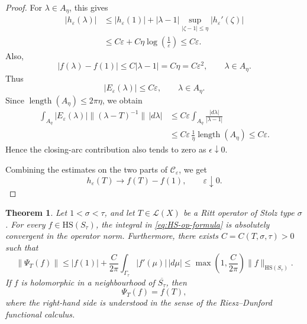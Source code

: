 \documentclass[11pt]{amsart}
\numberwithin{equation}{section}
\newtheorem{theorem}{Theorem}[section]
\theoremstyle{definition}
\theoremstyle{plain}
\def\L{L}
\newcommand{\HS}{\mathrm{HS}}
\renewcommand{\L}{\mathcal L}
\begin{document}
\begin{proof}
For \(\lambda\in A_\eta\), this gives
\[
\begin{aligned}
        |h_\varepsilon(\lambda)|
        &\le
        |h_\varepsilon(1)|
        +
        |\lambda-1|
        \sup_{|\zeta-1|\le\eta}|h_\varepsilon'(\zeta)|        \\
        &\le
        C\varepsilon
        +
        C\eta\log \left(\frac{1}{\varepsilon}\right)
        \le
        C\varepsilon .
\end{aligned}
\]
Also,
\[
        |f(\lambda)-f(1)|
        \le C|\lambda-1|
        =
        C\eta
        =
        C\varepsilon^2,
        \qquad \lambda\in A_\eta .
\]
Thus
\[
        |E_\varepsilon(\lambda)|\le C\varepsilon,
        \qquad \lambda\in A_\eta .
\]
Since \(\operatorname{length}(A_\eta)\le 2\pi \eta\), we obtain
\[
\begin{aligned}
        \int_{A_\eta}
        |E_\varepsilon(\lambda)|
        \|(\lambda -T)^{-1}\|\,|d\lambda|
        &\le
        C\varepsilon
        \int_{A_\eta} \frac{|d\lambda|}{|\lambda-1|}        \\
        &\le
        C\varepsilon\, \frac{1}{\eta}\operatorname{length}(A_\eta)
        \le
        C\varepsilon .
\end{aligned}
\]
Hence the closing-arc contribution also tends to zero as \(\epsilon \downarrow 0\).

Combining the estimates on the two parts of
\(\mathcal C_\varepsilon\), we get
\[
        h_\varepsilon(T)\longrightarrow f(T)-f(1), \qquad  \varepsilon\downarrow0. 
\]
\end{proof}


\begin{theorem}\label{thm:operator-reproducing}
Let $1<\sigma<\tau$, and let $T\in\L(X)$ be a Ritt operator of Stolz type
$\sigma$.  For every $f\in\HS(S_\tau)$, the integral in
\eqref{eq:HS-op-formula} is absolutely convergent in the operator norm. 
Furthermore, 
there exists $C=C(T,\sigma,\tau)>0$ such that
\begin{equation}\label{eq:HS-op-bound}
        \|\Psi_T(f)\|
        \le
        |f(1)|
        +
        \frac{C}{2\pi}
        \int_{\Gamma_\tau}|f'(\mu)|\,|d\mu|
        \le
        \max\left(1,\frac{C}{2\pi}\right)\|f\|_{\HS(S_\tau)} .
\end{equation}
If $f$ is holomorphic in a neighbourhood of $\overline{S_\tau}$, then
\begin{equation}\label{permr}
        \Psi_T(f)=f(T),
\end{equation}
where the right-hand side is understood in the sense of the Riesz--Dunford functional calculus.
\end{theorem}
\end{document}
